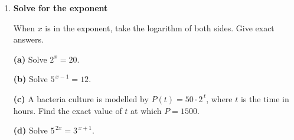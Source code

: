 \documentclass[12pt, twoside]{article}
\begin{document}
\begin{enumerate}[itemsep=0.5cm]
\newpage

\item[4.] \textbf{Solve for the exponent}

When $x$ is in the exponent, take the logarithm of both sides. Give
exact answers.

\textbf{(a)} Solve $2^x = 20$.

\vspace{4cm}

\textbf{(b)} Solve $5^{\,x-1} = 12$.

\vspace{4cm}

\textbf{(c)} A bacteria culture is modelled by $P(t) = 50 \cdot 2^{\,t}$,
where $t$ is the time in hours. Find the exact value of $t$ at which
$P = 1500$.

\vspace{4cm}

\textbf{(d)} Solve $5^{\,2x} = 3^{\,x+1}$.

\vspace{4cm}

\end{enumerate}
\end{document}
